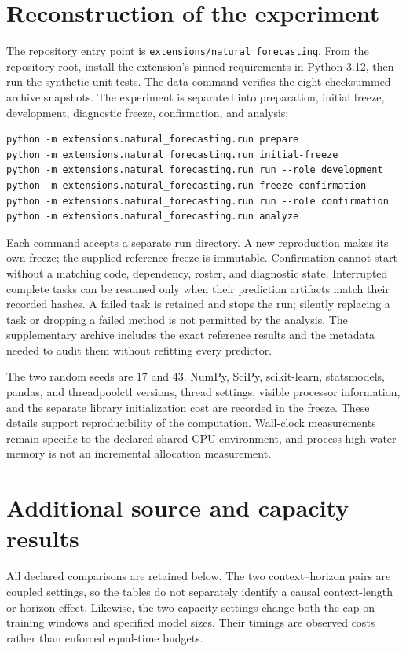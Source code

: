 \section{Reconstruction of the experiment}\label{app:reproduction}
The repository entry point is
\texttt{extensions/natural\_forecasting}. From the repository root, install
the extension's pinned requirements in Python 3.12, then run the synthetic
unit tests. The data command verifies the eight checksummed archive snapshots.
The experiment is separated into preparation, initial freeze, development,
diagnostic freeze, confirmation, and analysis:
\begin{verbatim}
python -m extensions.natural_forecasting.run prepare
python -m extensions.natural_forecasting.run initial-freeze
python -m extensions.natural_forecasting.run run --role development
python -m extensions.natural_forecasting.run freeze-confirmation
python -m extensions.natural_forecasting.run run --role confirmation
python -m extensions.natural_forecasting.run analyze
\end{verbatim}
Each command accepts a separate run directory. A new reproduction makes its
own freeze; the supplied reference freeze is immutable. Confirmation cannot
start without a matching code, dependency, roster, and diagnostic state.
Interrupted complete tasks can be resumed only when their prediction artifacts
match their recorded hashes. A failed task is retained and stops the run;
silently replacing a task or dropping a failed method is not permitted by the
analysis. The supplementary archive includes the exact reference results and
the metadata needed to audit them without refitting every predictor.

The two random seeds are 17 and 43. NumPy, SciPy, scikit-learn, statsmodels,
pandas, and threadpoolctl versions, thread settings, visible processor
information, and the separate library initialization cost are recorded in
the freeze. These details support reproducibility of the computation.
Wall-clock measurements remain specific to the declared shared CPU
environment, and process high-water memory is not an incremental allocation
measurement.



\section{Additional source and capacity results}\label{app:full-results}
All declared comparisons are retained below. The two context--horizon pairs
are coupled settings, so the tables do not separately identify a causal
context-length or horizon effect. Likewise, the two capacity settings change
both the cap on training windows and specified model sizes. Their timings are
observed costs rather than enforced equal-time budgets.



